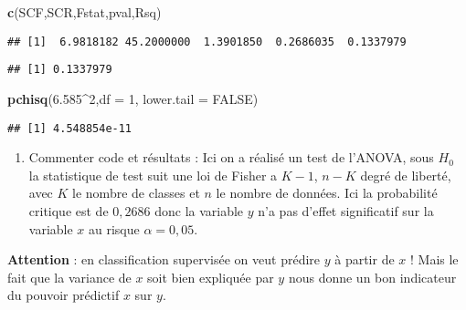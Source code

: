 \documentclass[
]{article}
\newenvironment{Shaded}{\begin{snugshade}}{\end{snugshade}}
\newcommand{\DataTypeTok}[1]{\textcolor[rgb]{0.13,0.29,0.53}{#1}}
\newcommand{\DecValTok}[1]{\textcolor[rgb]{0.00,0.00,0.81}{#1}}
\newcommand{\FloatTok}[1]{\textcolor[rgb]{0.00,0.00,0.81}{#1}}
\newcommand{\KeywordTok}[1]{\textcolor[rgb]{0.13,0.29,0.53}{\textbf{#1}}}
\newcommand{\NormalTok}[1]{#1}
\newcommand{\OperatorTok}[1]{\textcolor[rgb]{0.81,0.36,0.00}{\textbf{#1}}}
\newcommand{\OtherTok}[1]{\textcolor[rgb]{0.56,0.35,0.01}{#1}}
\providecommand{\tightlist}{%
  \setlength{\itemsep}{0pt}\setlength{\parskip}{0pt}}
\begin{document}
\begin{Shaded}
\begin{Highlighting}[]
\KeywordTok{c}\NormalTok{(SCF,SCR,Fstat,pval,Rsq)}
\end{Highlighting}
\end{Shaded}

\begin{verbatim}
## [1]  6.9818182 45.2000000  1.3901850  0.2686035  0.1337979
\end{verbatim}

\begin{Shaded}
\end{Shaded}

\begin{verbatim}
## [1] 0.1337979
\end{verbatim}

\begin{Shaded}
\begin{Highlighting}[]
\KeywordTok{pchisq}\NormalTok{(}\FloatTok{6.585}\OperatorTok{^}\DecValTok{2}\NormalTok{,}\DataTypeTok{df =} \DecValTok{1}\NormalTok{, }\DataTypeTok{lower.tail =} \OtherTok{FALSE}\NormalTok{)}
\end{Highlighting}
\end{Shaded}

\begin{verbatim}
## [1] 4.548854e-11
\end{verbatim}

\begin{enumerate}
\def\labelenumi{\arabic{enumi}.}
\setcounter{enumi}{1}
\tightlist
\item
  Commenter code et résultats : Ici on a réalisé un test de l'ANOVA,
  sous \(H_0\) la statistique de test suit une loi de Fisher a \(K-1\),
  \(n-K\) degré de liberté, avec \(K\) le nombre de classes et \(n\) le
  nombre de données. Ici la probabilité critique est de \(0,2686\) donc
  la variable \(y\) n'a pas d'effet significatif sur la variable \(x\)
  au risque \(\alpha = 0,05\).
\end{enumerate}

\textbf{Attention} : en classification supervisée on veut prédire \(y\)
à partir de \(x\) ! Mais le fait que la variance de \(x\) soit bien
expliquée par \(y\) nous donne un bon indicateur du pouvoir prédictif
\(x\) sur \(y\).
\end{document}
